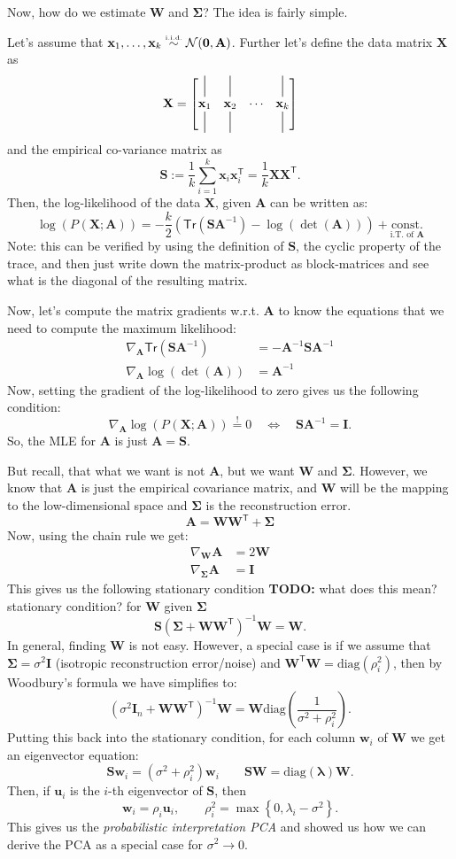 \documentclass[a2paper,4pt]{extarticle}
\newcommand{\cN}{\mathcal{N}}
\newcommand{\set}[1]{\left\{ #1 \right\}}
\newcommand{\Tr}[1]{\mathsf{Tr}\left( #1 \right)}
\newcommand{\Prob}[2][]{P_{#1}\left( #2 \right)}
\newcommand{\riid}{\stackrel{\text{\tiny i.i.d.}}{\sim}}
\newcommand*{\T}{\mathsf{T}}
\newcommand{\diag}{\text{diag}}
\newcommand{\mbeq}{\stackrel{!}{=}}
\newcommand{\mat}[1]{\mathbf{#1}}
\renewcommand{\vec}[1]{\mathbf{#1}}
\newcommand{\vu}{\vec{u}}
\newcommand{\vw}{\vec{w}}
\newcommand{\vx}{\vec{x}}
\newcommand{\vlambda}{\boldsymbol{\lambda}}
\newcommand{\MA}{\mat{A}}
\newcommand{\MI}{\mat{I}}
\newcommand{\MO}{\mat{0}}
\newcommand{\MS}{\mat{S}}
\newcommand{\MW}{\mat{W}}
\newcommand{\MX}{\mat{X}}
\newcommand{\MSigma}{\mat{\Sigma}}
\newcommand*{\vertbar}{\rule[-1ex]{0.5pt}{4ex}}
\newcommand{\todo}[1]{\textbf{TODO:} #1}
\newcommand{\todo}[1]{%
}
\begin{document}
\begin{landscape}
\begin{multicols*}{7}
Now, how do we estimate $\MW$ and $\MSigma$? The idea is fairly simple. 

Let's assume that $\vx_1,\ldots,\vx_k\riid\cN(\MO,\MA)$. Further let's define
the data matrix $\MX$ as
\[
\MX=\begin{bmatrix}
\vertbar & \vertbar && \vertbar\\
\vx_1 & \vx_2 & \cdots & \vx_k\\
\vertbar & \vertbar && \vertbar\\
\end{bmatrix}
\]
and the empirical co-variance matrix as
\[
\MS:=\frac{1}{k}\sum_{i=1}^{k}\vx_i\vx_i^\T
=
\frac{1}{k}\MX\MX^\T.
\]
Then, the log-likelihood of the data $\MX$, given $\MA$ can be written as:
\[
\log\left(\Prob{\MX;\MA}\right)
=
-\frac{k}{2}\left(\Tr{\MS\MA^{-1}}-\log\left(\det(\MA)\right)\right)
+ \underset{\text{i.T. of }\MA}{\text{const.}}
\]
Note: this can be verified by using the definition of $\MS$, the cyclic property
of the trace, and then just write down the matrix-product as block-matrices and
see what is the diagonal of the resulting matrix.

Now, let's compute the matrix gradients w.r.t. $\MA$ to know the equations that
we need to compute the maximum likelihood:
\begin{align*}
\nabla_{\MA}\Tr{\MS\MA^{-1}}
&=-\MA^{-1}\MS\MA^{-1}
\\
\nabla_{\MA}\log\left(\det(\MA)\right)&=\MA^{-1}
\end{align*}
Now, setting the gradient of the log-likelihood to zero gives us the following
condition:
\[
\nabla_{\MA}\log\left(\Prob{\MX;\MA}\right)\mbeq 0
\quad\Longleftrightarrow\quad
\MS\MA^{-1}=\MI.
\]
So, the MLE for $\MA$ is just $\MA=\MS$.

But recall, that what we want is not $\MA$, but we want $\MW$ and $\MSigma$.
However, we know that $\MA$ is just the empirical covariance matrix, and $\MW$
will be the mapping to the low-dimensional space and $\MSigma$ is the
reconstruction error.
\[
\MA=\MW\MW^\T+\MSigma
\]
Now, using the chain rule we get:
\begin{align*}
\nabla_{\MW}\MA&=2\MW
\\
\nabla_{\MSigma}\MA &= \MI
\end{align*}
This gives us the following stationary condition \todo{what does this mean?
stationary condition?} for $\MW$ given $\MSigma$
\[
\MS(\MSigma+\MW\MW^\T)^{-1}\MW=\MW.
\]
In general, finding $\MW$ is not easy. However, a special case is if we assume
that $\MSigma=\sigma^2\MI$ (isotropic reconstruction error/noise) and
$\MW^\T\MW=\diag(\rho_i^2)$, then by Woodbury's formula we have
simplifies to:
\[
\left(\sigma^2\MI_n+\MW\MW^\T\right)^{-1}\MW
=
\MW\diag(\frac{1}{\sigma^2+\rho_i^2}).
\]
Putting this back into the stationary condition, for each column $\vw_i$ of
$\MW$ we get an eigenvector equation:
\[
\MS\vw_i = (\sigma^2+\rho_i^2)\vw_i
\qquad
\MS\MW
=\diag(\vlambda)\MW.
\]
Then, if $\vu_i$ is the $i$-th eigenvector of $\MS$, then
\[
\vw_i=\rho_i\vu_i,
\qquad
\rho_i^2=\max\set{0,\lambda_i-\sigma^2}.
\]
This gives us the \emph{probabilistic interpretation PCA} and showed us how
we can derive the PCA as a special case for $\sigma^2\to 0$.


\end{multicols*}
\end{landscape}
\end{document}
